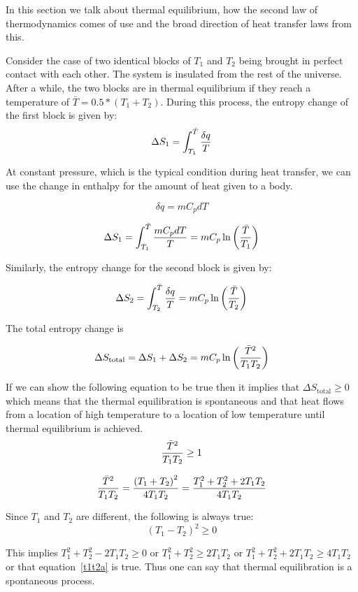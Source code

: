In this section we talk about thermal equilibrium, how the second law of thermodynamics comes of use and the broad direction of heat transfer laws from this.


Consider the case of two identical blocks of $T_1$ and $T_2$ being brought in perfect contact with each other. The system is insulated from the rest of the universe. After a while, the two blocks are in thermal equilibrium if they reach a temperature of $\bar{T} = 0.5*(T_1+T_2)$. During this process, the entropy change of the first block is given by:
$$ \Delta S_1 = \int_{T_1}^{\bar{T}}{\delta q \over T}$$

At constant pressure, which is the typical condition during heat transfer, we can use the change in enthalpy for the amount of heat given to a body.

$$ \delta q = m C_p dT$$

$$ \Delta S_1 = \int_{T_1}^{\bar{T}}{m C_p dT \over T} = m C_p \ln\left({ \bar{T} \over T_1} \right)$$

Similarly, the entropy change for the second block is given by:

$$ \Delta S_2 = \int_{T_2}^{\bar{T}}{\delta q \over T} = m C_p \ln\left({ \bar{T} \over T_2} \right) $$

The total entropy change is 

$$ \Delta S_\text{total} = \Delta S_1 + \Delta S_2 = m C_p \ln \left( { \bar{T}^2 \over T_1 T_2} \right) $$

If we can show the following equation to be true then it implies that $\Delta S_\text{total} \ge 0 $ which means that the thermal equilibration is spontaneous and that heat flows from a location of high temperature to a location of low temperature until thermal equilibrium is achieved.
\begin{equation}
\label{t1t2a}
{ \bar{T}^2 \over T_1 T_2} \ge 1
\end{equation}

$$ { \bar{T}^2 \over T_1 T_2} = { \left( T_1 + T_2 \right)^2 \over 4 T_1 T_2} = { T_1^2 + T_2^2 + 2 T_1 T_2 \over 4 T_1 T_2}$$

Since $T_1$ and $T_2$ are different, the following is always true: 
$$ \left(T_1 - T_2 \right)^2 \ge 0$$ 

This implies $ T_1^2 + T_2^2 - 2 T_1 T_2  \ge 0$ or $ T_1^2 + T_2^2 \ge 2 T_1 T_2 $ or $ T_1^2 + T_2^2 + 2 T_1 T_2 \ge 4 T_1 T_2 $ or that equation~\ref{t1t2a} is true. Thus one can say that thermal equilibration is a spontaneous process.

